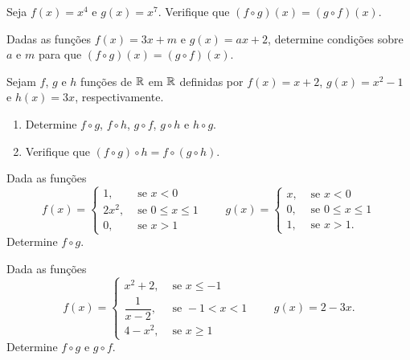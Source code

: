\documentclass[12pt]{exam}
\begin{document}
    \vspace{.6cm}

    \questao{} Seja $f(x) = x^4$ e $g(x) = x^7$. Verifique que $(f\circ g)(x) = (g\circ f)(x)$.

    \vspace{.3cm}

    \questao{} Dadas as fun\c{c}\~oes $f(x) = 3x + m$ e $g(x) = ax + 2$, determine condi\c{c}\~oes sobre $a$ e $m$ para que $(f\circ g)(x) = (g\circ f)(x)$.

    \vspace{.3cm}

    \questao{} Sejam $f$, $g$ e $h$ fun\c{c}\~oes de $\mathbb{R}$ em $\mathbb{R}$ definidas por $f(x) = x + 2$, $g(x) = x^2 - 1$ e $h(x) = 3x$, respectivamente.
    \begin{enumerate}[label={\alph*})]
        \item Determine $f \circ g$, $f \circ h$, $g \circ f$, $g \circ h$ e $h \circ g$.
        \item Verifique que $(f \circ g)\circ h = f \circ (g \circ h)$.
    \end{enumerate}

    \vspace{.3cm}

    \questao{} Dada as fun\c{c}\~oes
    \[
        f(x) = \begin{cases}
            1, & \mbox{ se } x < 0\\
            2x^2, & \mbox{ se } 0 \le x \le 1\\
            0, & \mbox{ se } x > 1
        \end{cases} \qquad g(x) = \begin{cases}
            x, & \mbox{ se } x < 0\\
            0, & \mbox{ se } 0 \le x \le 1\\
            1, & \mbox{ se } x > 1.
        \end{cases}
    \]
    Determine $f\circ g$.

    \vspace{.3cm}

    \questao{} Dada as fun\c{c}\~oes
    \[
        f(x) = \begin{cases}
            x^2 + 2, & \mbox{ se } x \le -1\\
            \dfrac{1}{x - 2}, & \mbox{ se } -1 < x < 1\\
            4 - x^2, & \mbox{ se } x \ge 1
        \end{cases} \qquad g(x) = 2 - 3x.
    \]
    Determine $f\circ g$ e $g \circ f$.
\end{document}
